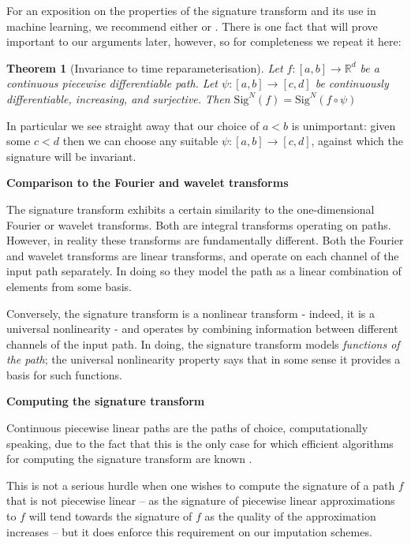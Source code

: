 \documentclass{article}
\renewcommand{\subsubsection}[1]{\textbf{#1}

} %
\newcommand{\reals}{\mathbb{R}}
\newcommand{\sig}{\mathrm{Sig}^N}
\newtheorem{theorem}{Theorem}
\begin{document}
For an exposition on the properties of the signature transform and its use in machine learning, we recommend either \citep{primer2016} or \citep[Appendix A]{kidger2019deep}. There is one fact that will prove important to our arguments later, however, so for completeness we repeat it here:
\begin{theorem}[Invariance to time reparameterisation]\label{theorem:invariancetime}
Let $f \colon [a, b] \to \reals^d$ be a continuous piecewise differentiable path. Let $\psi \colon [a, b] \to [c, d]$ be continuously differentiable, increasing, and surjective. Then $\sig(f) = \sig(f \circ \psi)$
\end{theorem}
In particular we see straight away that our choice of $a < b$ is unimportant: given some $c < d$ then we can choose any suitable $\psi \colon [a, b] \to [c, d]$, against which the signature will be invariant.

\subsubsection{Comparison to the Fourier and wavelet transforms}
The signature transform exhibits a certain similarity to the one-dimensional Fourier or wavelet transforms. Both are integral transforms operating on paths. However, in reality these transforms are fundamentally different. Both the Fourier and wavelet transforms are linear transforms, and operate on each channel of the input path separately. In doing so they model the path as a linear combination of elements from some basis.

Conversely, the signature transform is a nonlinear transform - indeed, it is a universal nonlinearity - and operates by combining information between different channels of the input path. In doing, the signature transform models \emph{functions of the path}; the universal nonlinearity property says that in some sense it provides a basis for such functions.

\subsubsection{Computing the signature transform}
Continuous piecewise linear paths are the paths of choice, computationally speaking, due to the fact that this is the only case for which efficient algorithms for computing the signature transform are known \citep{signatory}.

This is not a serious hurdle when one wishes to compute the signature of a path $f$ that is not piecewise linear -- as the signature of piecewise linear approximations to $f$ will tend towards the signature of $f$ as the quality of the approximation increases \citep{TODO} -- but it does enforce this requirement on our imputation schemes.
\end{document}
